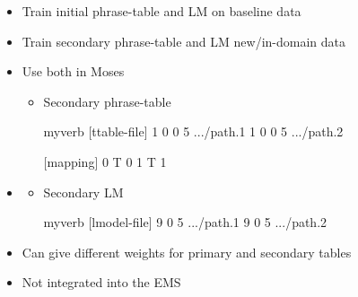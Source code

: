 \documentclass[landscape]{uedslides2C}
\begin{document}

\begin{itemize} \itemsep -1mm
\item Train initial phrase-table and LM on baseline data

\item Train secondary phrase-table and LM new/in-domain data

\item Use both in Moses
  \begin{itemize}

  \item Secondary phrase-table
  \begin{SaveVerbatim}{myverb} 
    [ttable-file]
    1 0 0 5 .../path.1
    1 0 0 5 .../path.2
    
    [mapping]
    0 T 0
    1 T 1
  \end{SaveVerbatim}
  \colorbox{gray}{}

  \end{itemize}
\end{itemize}


\begin{itemize} \itemsep -1mm
  \item
  \begin{itemize}
  \item Secondary LM
  \begin{SaveVerbatim}{myverb} 
    [lmodel-file]
    9 0 5 .../path.1
    9 0 5 .../path.2
  \end{SaveVerbatim}
  \colorbox{gray}{}

  \end{itemize}

  \item Can give different weights for primary and secondary tables
  \item Not integrated into the EMS
\end{itemize}
\end{document}
